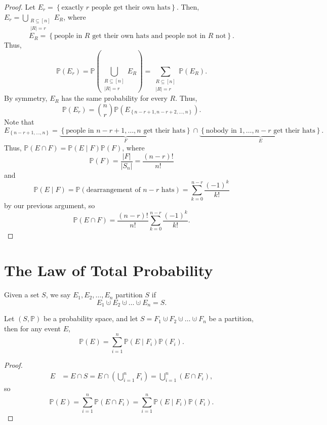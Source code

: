 \begin{proof}
    Let \(E_r = \left\{ \text{exactly } r \text{ people get their own hats}   \right\} \). Then, \(E_r = \bigcup_{\substack{R \subseteq [n] \\ \vert R \vert = r}} E_R\), where
    \[
        E_R = \left\{ \text{people in } R \text{ get their own hats and people not in } R \text{ not}     \right\}. 
    \]  
    Thus, 
    \[
        \mathbb{P} (E_r) = \mathbb{P} \left( \bigcup_{\substack{R \subseteq [n] \\ \vert R \vert = r}} E_R \right) = \sum_{\substack{R \subseteq [n] \\ \vert R \vert = r }} \mathbb{P} (E_R).  
    \]
    By symmetry, \(E_R\) has the same probability for every \(R\). Thus,
    \[
        \mathbb{P} (E_r) = \binom{n}{r} \mathbb{P} \left( E_{\left\{ n - r + 1, n - r + 2, \dots , n \right\} } \right). 
    \]
    Note that 
    \[
        E_{\left\{ n-r+1,\dots ,n \right\} } = \underbrace{\left\{ \text{people in } n-r+1, \dots , n \text{ get their hats}   \right\}}_{F} \cap \underbrace{\left\{ \text{nobody in } 1,\dots ,n-r \text{ get their hats}   \right\}}_{E}.  
    \]
    Thus, \(\mathbb{P} (E \cap F) = \mathbb{P} (E \mid F) \mathbb{P} (F)\), where 
    \[
        \mathbb{P} (F) = \frac{\vert F \vert }{\vert S_n \vert } = \frac{(n-r)!}{n!} 
    \] 
    and 
    \[
        \mathbb{P} (E \mid F) = \mathbb{P} (\text{dearrangement of } n-r \text{ hats}) = \sum_{k=0}^{n-r} \frac{(-1)^k}{k!} 
    \]
    by our previous argument, so 
    \[
        \mathbb{P} (E \cap F) = \frac{(n-r)!}{n!} \sum_{k=0}^{n-r} \frac{(-1)^k}{k!}. 
    \]
\end{proof}

\section{The Law of Total Probability}
\begin{definition}
    Given a set \(S\), we say \(E_1, E_2, \dots , E_n\) partition \(S\) if 
    \[
        E_1 \cupdot E_2 \cupdot \dots \cupdot E_n = S.
    \]   
\end{definition}

\begin{theorem}
    Let \((S, \mathbb{P} )\) be a probability space, and let \(S = F_1 \cupdot F_2 \cupdot \dots \cupdot F_n\) be a partition, then for any event \(E\),
    \[
        \mathbb{P} (E) = \sum_{i=1}^n \mathbb{P} (E \mid F_i) \mathbb{P} (F_i). 
    \]   
\end{theorem}

\begin{proof}
    \begin{align*}
        E &= E \cap S = E \cap \left( \bigcup_{i=1}^{n} F_i  \right) = \bigcup_{i=1}^{n} (E \cap F_i),  
    \end{align*}
    so 
    \[
        \mathbb{P} (E) = \sum_{i=1}^n \mathbb{P} (E \cap F_i) = \sum_{i=1}^n \mathbb{P} (E \mid F_i) \mathbb{P} (F_i).  
    \]
\end{proof}